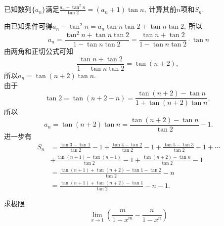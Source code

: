 \begin{solution}
	
	\end{solution}
	\newpage
	\begin{problem}
		已知数列$\{a_n\}$满足$\frac{a_n-\tan^2 n}{\tan 2}=(a_n+1)\tan n,\ $计算其前$n$项和$S_n.$
	\end{problem}
	\begin{solution}
		由已知条件可得$a_n-\tan^2n=a_n\tan n\tan 2+\tan n\tan 2,\ $所以
		$$a_n=\frac{\tan^2n+\tan n\tan 2}{1-\tan n\tan 2}=\frac{\tan n+\tan 2}{1-\tan n\tan 2}\cdot\tan n$$
		由两角和正切公式可知
		$$\frac{\tan n+\tan 2}{1-\tan n\tan 2}=\tan (n+2),\ $$
		所以$a_n=\tan(n+2)\tan n.$\\
		由于
		$$\tan 2=\tan (n+2-n)=\frac{\tan(n+2)-\tan n}{1+\tan(n+2)\tan n},\ $$
		所以
		$$a_n=\tan(n+2)\tan n=\frac{\tan(n+2)-\tan n}{\tan 2}-1.$$
		进一步有
		$$\begin{aligned}
			S_n&=\frac{\tan 3-\tan 1}{\tan 2}-1+\frac{\tan 4-\tan 2}{\tan 2}-1+\frac{\tan 5-\tan 3}{\tan 2}-1+\cdots\\
			&+\frac{\tan(n+1)-\tan(n-1)}{\tan 2}-1+\frac{\tan(n+2)-\tan n}{\tan 2}-1\\
			&=\frac{\tan(n+1)+\tan(n+2)-\tan 1-\tan 2}{\tan 2}-n\\
			&=\frac{\tan(n+1)+\tan(n+2)-\tan 1}{\tan 2}-n-1.
		\end{aligned}$$
	\end{solution}
	\newpage
	\begin{problem}
		求极限
		$$\lim\limits_{x\rightarrow 1}\left(\frac{m}{1-x^m}-\frac{n}{1-x^n}\right)$$
	\end{problem}
